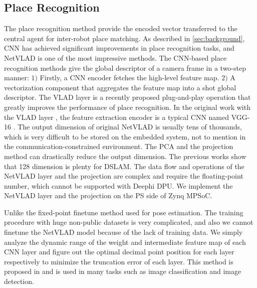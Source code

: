 
\subsection{Place Recognition}


The place recognition method provide the encoded vector transferred to the central agent for inter-robot place matching. As described in \cref{sec:background}, CNN has achieved significant improvements in place recognition tasks, and NetVLAD \cite{Arandjelovic:2017997} is one of the most impressive methods. The CNN-based place recognition methods give the global descriptor of a camera frame in a two-step manner: $1)$ Firstly, a CNN encoder fetches the high-level feature map. $2)$ A vectorization component that aggregates the feature map into a shot global descriptor. The VLAD layer \cite{Arandjelovic:2017997} is a recently proposed plug-and-play operation that greatly improves the performance of place recognition. In the original work with the VLAD layer \cite{Arandjelovic:2017997}, the feature extraction encoder is a typical CNN named VGG-16 \cite{Simonyan:20143be}. The output dimension of original NetVLAD is usually tens of thousands, which is very difficult to be stored on the embedded system, not to mention in the communication-constrained environment. The PCA and the projection method can drastically reduce the output dimension. The previous works\cite{Cieslewski:20187ee} show that 128 dimension is plenty for DSLAM. The data flow and operations of the NetVLAD layer and the projection are complex and require the floating-point number, which cannot be supported with Deephi DPU. We implement the NetVLAD layer and the projection on the PS side of Zynq MPSoC.


Unlike the fixed-point finetune method used for pose estimation. The training procedure with huge non-public datasets is very complicated, and also we cannot finetune the NetVLAD model because of the lack of training data. We simply analyze the dynamic range of the weight and intermediate feature map of each CNN layer and figure out the optimal decimal point position for each layer respectively to minimize the truncation error of each layer.
This method is proposed in \cite{Qiu:2016151} and is used in many tasks such as image classification and image detection.

